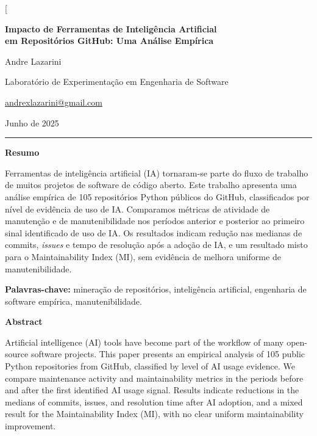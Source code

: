 \documentclass[12pt,a4paper,twocolumn]{article}
\begin{document}

\twocolumn[{%
\begin{@twocolumnfalse}
\vspace*{0.4cm}
{\centering
  {\LARGE\bfseries Impacto de Ferramentas de Inteligência Artificial\\[4pt]
   em Repositórios GitHub: Uma Análise Empírica\par}
  \vspace{0.5em}
  {\large Andre Lazarini\par}
  \vspace{0.2em}
  {\small Laboratório de Experimentação em Engenharia de Software\par}
  {\small \href{mailto:andrexlazarini@gmail.com}{andrexlazarini@gmail.com}\par}
  \vspace{0.3em}
  {\small Junho de 2025\par}
\par}

\vspace{0.6em}
\noindent\rule{\linewidth}{0.5pt}

\begin{center}\textbf{Resumo}\end{center}
\small
Ferramentas de inteligência artificial (IA) tornaram-se parte do fluxo de trabalho
de muitos projetos de software de código aberto. Este trabalho apresenta uma análise
empírica de 105 repositórios Python públicos do GitHub, classificados por nível de
evidência de uso de IA. Comparamos métricas de atividade de manutenção e de
manutenibilidade nos períodos anterior e posterior ao primeiro sinal identificado de
uso de IA. Os resultados indicam redução nas medianas de commits, \textit{issues} e
tempo de resolução após a adoção de IA, e um resultado misto para o
Maintainability Index (MI), sem evidência de melhora uniforme de manutenibilidade.

\vspace{0.4em}
\noindent\textbf{Palavras-chave:} mineração de repositórios, inteligência artificial,
engenharia de software empírica, manutenibilidade.

\vspace{0.5em}
\begin{center}\textbf{Abstract}\end{center}
Artificial intelligence (AI) tools have become part of the workflow of many open-source
software projects. This paper presents an empirical analysis of 105 public Python
repositories from GitHub, classified by level of AI usage evidence. We compare
maintenance activity and maintainability metrics in the periods before and after the
first identified AI usage signal. Results indicate reductions in the medians of commits,
issues, and resolution time after AI adoption, and a mixed result for the Maintainability
Index (MI), with no clear uniform maintainability improvement.


\end{@twocolumnfalse}}
\end{document}

